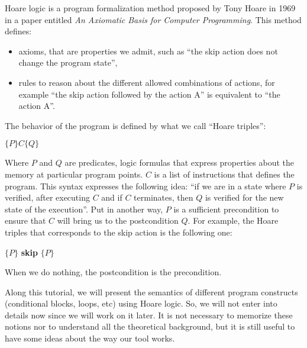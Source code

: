 




Hoare logic is a program formalization method proposed by Tony Hoare in
1969 in a paper entitled \emph{An Axiomatic Basis for Computer
Programming}. This method defines:



\begin{itemize}
\item   axioms, that are properties we admit, such as ``the skip action does
  not change the program state'',
\item   rules to reason about the different allowed combinations of actions,
  for example ``the skip action followed by the action A'' is equivalent
  to ``the action A''.
\end{itemize}


The behavior of the program is defined by what we call ``Hoare
triples'':




\begin{center}
$\{P\} C \{Q\}$


\end{center}


Where $P$ and $Q$ are predicates, logic formulas that express
properties about the memory at particular program points. $C$ is a
list of instructions that defines the program. This syntax expresses the
following idea: ``if we are in a state where $P$ is verified, after
executing $C$ and if $C$ terminates, then $Q$ is verified for the
new state of the execution''. Put in another way, $P$ is a sufficient
precondition to ensure that $C$ will bring us to the postcondition
$Q$. For example, the Hoare triples that corresponds to the skip
action is the following one:




\begin{center}
$\{P\}$ \textbf{skip} $\{P\}$


\end{center}


When we do nothing, the postcondition is the precondition.



Along this tutorial, we will present the semantics of different program
constructs (conditional blocks, loops, etc) using Hoare logic. So, we
will not enter into details now since we will work on it later. It is
not necessary to memorize these notions nor to understand all the
theoretical background, but it is still useful to have some ideas about
the way our tool works.



